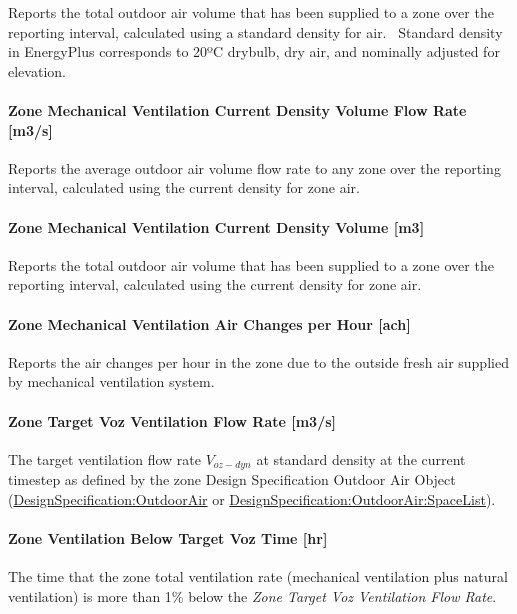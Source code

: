 Reports the total outdoor air volume that has been supplied to a zone over the reporting interval, calculated using a standard density for air.~ Standard density in EnergyPlus corresponds to 20ºC drybulb, dry air, and nominally adjusted for elevation.

\paragraph{Zone Mechanical Ventilation Current Density Volume Flow Rate {[}m3/s{]}}\label{zone-mechanical-ventilation-current-density-volume-flow-rate-m3s}

Reports the average outdoor air volume flow rate to any zone over the reporting interval, calculated using the current density for zone air.

\paragraph{Zone Mechanical Ventilation Current Density Volume {[}m3{]}}\label{zone-mechanical-ventilation-current-density-volume-m3}

Reports the total outdoor air volume that has been supplied to a zone over the reporting interval, calculated using the current density for zone air.

\paragraph{Zone Mechanical Ventilation Air Changes per Hour {[}ach{]}}\label{zone-mechanical-ventilation-air-changes-per-hour-ach}

Reports the air changes per hour in the zone due to the outside fresh air supplied by mechanical ventilation system.

\paragraph{Zone Target Voz Ventilation Flow Rate {[}m3/s{]}}\label{zone-target-voz-ventilation-flow-rate}
The target ventilation flow rate \(V_{oz-dyn}\) at standard density at the current timestep as defined by the zone Design Specification Outdoor Air Object (\hyperref[designspecificationoutdoorair]{DesignSpecification:OutdoorAir} or \hyperref[designspecificationoutdoorairspacelist]{DesignSpecification:OutdoorAir:SpaceList}).

\paragraph{Zone Ventilation Below Target Voz Time {[}hr{]}}\label{zone-ventilation-below-target-voz-time}
The time that the zone total ventilation rate (mechanical ventilation plus natural ventilation) is more than 1\% below the \emph{Zone Target Voz Ventilation Flow Rate}.

